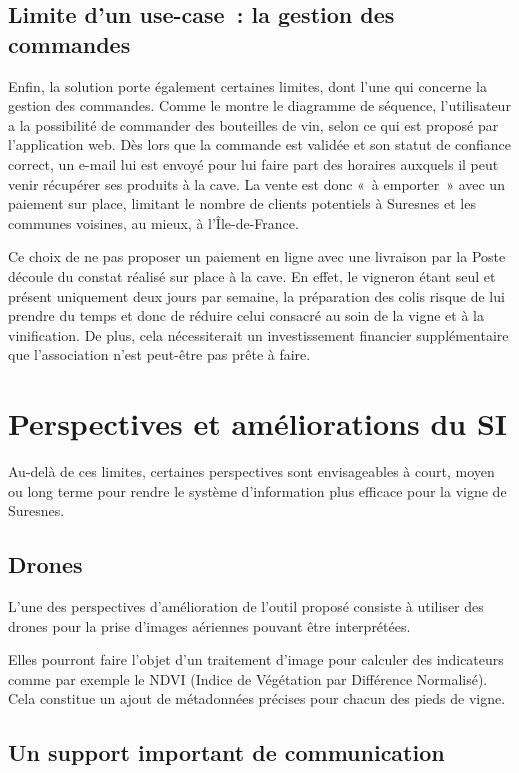 \documentclass[a4paper, titlepage]{report}
\begin{document}
\subsection{Limite d'un use-case~: la gestion des commandes}

Enfin, la solution porte également certaines limites, dont l'une qui
concerne la gestion des commandes. Comme le montre le diagramme de
séquence, l'utilisateur a la possibilité de commander des
bouteilles de vin, selon ce qui est proposé par l'application web. Dès
lors que la commande est validée et son statut de confiance correct, un
e-mail lui est envoyé pour lui faire part des horaires auxquels il peut
venir récupérer ses produits à la cave. La vente est donc «~à emporter~»
avec un paiement sur place, limitant le nombre de clients potentiels à
Suresnes et les communes voisines, au mieux, à l'Île-de-France.

Ce choix de ne pas proposer un paiement en ligne avec une livraison par
la Poste découle du constat réalisé sur place à la cave. En effet, le
vigneron étant seul et présent uniquement deux jours par semaine, la
préparation des colis risque de lui prendre du temps et donc de réduire
celui consacré au soin de la vigne et à la vinification. De plus, cela nécessiterait un investissement financier supplémentaire que l'association n'est peut-être pas prête à faire. 

\section{Perspectives et améliorations du SI}

Au-delà de ces limites, certaines perspectives sont envisageables à
court, moyen ou long terme pour rendre le système d'information plus efficace pour la vigne de Suresnes.

\subsection{Drones}

L'une des perspectives d'amélioration de l'outil proposé consiste à utiliser des drones pour la prise d'images aériennes pouvant être interprétées.

Elles pourront faire l'objet d'un traitement d'image pour calculer des indicateurs comme par exemple le NDVI (Indice de Végétation par Différence Normalisé). Cela constitue un ajout de métadonnées précises pour chacun des pieds de vigne. 

\subsection{Un support important de communication}
\end{document}

